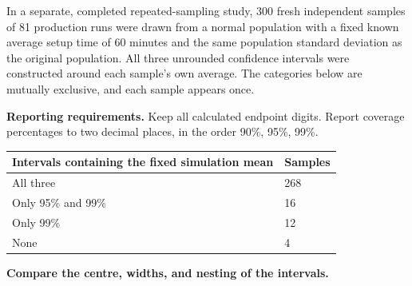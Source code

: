 In a separate, completed repeated-sampling study, 300 fresh independent samples of 81 production runs were drawn from a normal population with a fixed known average setup time of 60 minutes and the same population standard deviation as the original population. All three unrounded confidence intervals were constructed around each sample's own average. The categories below are mutually exclusive, and each sample appears once.

\textbf{Reporting requirements.} Keep all calculated endpoint digits. Report coverage percentages to two decimal places, in the order 90\%, 95\%, 99\%.

\begin{center}\begin{tabular}{@{}ll@{}}\toprule
Intervals containing the fixed simulation mean & Samples\\\midrule
All three & 268\\
Only 95\% and 99\% & 16\\
Only 99\% & 12\\
None & 4\\
\bottomrule\end{tabular}\end{center}


\BlankInformationTable
\clearpage
{}

\clearpage
{}
\textbf{Compare the centre, widths, and nesting of the intervals.}
\workspace{.65in}

